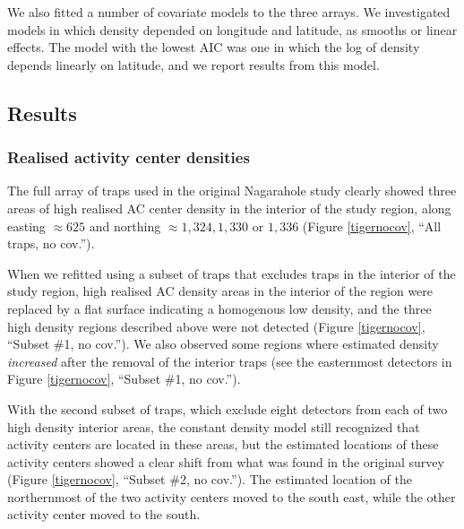 \documentclass[10pt,a4paper]{article}
\begin{document}
We also fitted a number of covariate models to the three arrays. We investigated models in which density depended on longitude and latitude, as smooths or linear effects. The model with the lowest AIC was one in which the log of density depends linearly on latitude, and we report results from this model. 

\subsection{Results} 

\subsubsection{Realised activity center densities}

The full array of traps used in the original Nagarahole study clearly showed three areas of high realised AC center density in the interior of the study region, along easting $\approx 625$ and northing $\approx 1,324, 1,330$ or $1,336$ (Figure \ref{tigernocov}, ``All traps, no cov.''). 

When we refitted using a subset of traps that excludes traps in the interior of the study region, high realised AC density areas in the interior of the region were replaced by a flat surface indicating a homogenous low density, and the three high density regions described above were not detected  (Figure \ref{tigernocov}, ``Subset \#1, no cov.''). We also observed some regions where estimated density {\it increased} after the removal of the interior traps (see the easternmost detectors in Figure \ref{tigernocov}, ``Subset \#1, no cov.''). %

With the second subset of traps, which exclude eight detectors from each of two high density interior areas, the constant density model still recognized that activity centers are located in these areas, but the estimated locations of these activity centers showed a clear shift from what was found in the original survey (Figure \ref{tigernocov}, ``Subset \#2, no cov.''). The estimated location of the northernmost of the two activity centers moved to the south east, while the other activity center moved to the south.
\end{document}
